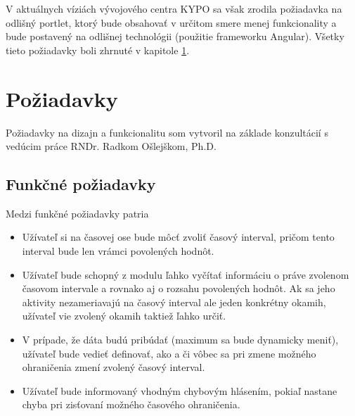 \documentclass[
  digital, %
  twoside, %
  notable,   %
  nolof,   %
  nolot,   %
]{fithesis3}
\begin{document}
V aktuálnych víziách vývojového centra KYPO sa však zrodila požiadavka na odlišný portlet, ktorý bude obsahovať v určitom smere menej funkcionality a bude postavený na odlišnej technológii (použitie frameworku Angular). Všetky tieto požiadavky boli zhrnuté v kapitole \ref{requirements}.

\clearpage

\section{Požiadavky}
\label{requirements}
Požiadavky na dizajn a funkcionalitu som vytvoril na základe konzultácií s vedúcim práce RNDr. Radkom Ošlejškom, Ph.D.

\subsection{Funkčné požiadavky}
\label{funkcne_poziadavky}
Medzi funkčné požiadavky patria
\begin{itemize}
\item Užívateľ si na časovej ose bude môcť zvoliť časový interval, pričom tento interval bude len vrámci povolených hodnôt.
\item Užívateľ bude schopný z modulu ľahko vyčítať informáciu o práve zvolenom časovom intervale a rovnako aj o rozsahu povolených hodnôt. Ak sa jeho aktivity nezameriavajú na časový interval ale jeden konkrétny okamih, užívateľ vie zvolený okamih taktiež ľahko určiť.
\item V prípade, že dáta budú pribúdať (maximum sa bude dynamicky meniť), užívateľ bude vedieť definovať, ako a či vôbec sa pri zmene možného ohraničenia zmení zvolený časový interval.
\item Užívateľ bude informovaný vhodným chybovým hlásením, pokiaľ nastane chyba pri zisťovaní možného časového ohraničenia.
\end{itemize}
\end{document}

